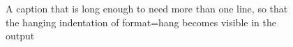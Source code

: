 \documentclass{article}
\begin{document}
\begin{figure}[h]
  \caption{A caption that is long enough to need more than one line, so that the
    hanging indentation of format=hang becomes visible in the output}
\end{figure}
\end{document}
